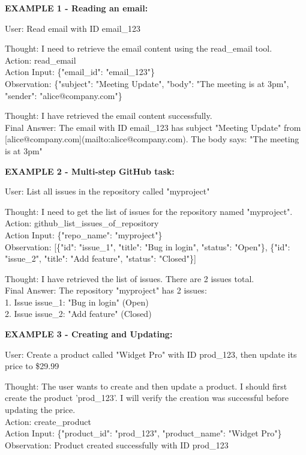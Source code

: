 \documentclass{article}
\theoremstyle{plain}
\theoremstyle{definition}
\theoremstyle{remark}
\begin{document}
\begin{tcolorbox}
\textbf{EXAMPLE 1 - Reading an email:}

User: Read email with ID email\_123

Thought: I need to retrieve the email content using the read\_email tool.\\
Action: read\_email\\
Action Input: \{"email\_id": "email\_123"\}\\
Observation: \{"subject": "Meeting Update", "body": "The meeting is at 3pm", "sender": "alice@company.com"\}

Thought: I have retrieved the email content successfully.\\
Final Answer: The email with ID email\_123 has subject "Meeting Update" from [alice@company.com](mailto:alice@company.com). The body says: "The meeting is at 3pm"

\textbf{EXAMPLE 2 - Multi-step GitHub task:}

User: List all issues in the repository called "myproject"

Thought: I need to get the list of issues for the repository named "myproject".\\
Action: github\_list\_issues\_of\_repository\\
Action Input: \{"repo\_name": "myproject"\}\\
Observation: [\{"id": "issue\_1", "title": "Bug in login", "status": "Open"\}, \{"id": "issue\_2", "title": "Add feature", "status": "Closed"\}]

Thought: I have retrieved the list of issues. There are 2 issues total.\\
Final Answer: The repository "myproject" has 2 issues:\\
1. Issue issue\_1: "Bug in login" (Open)\\
2. Issue issue\_2: "Add feature" (Closed)

\textbf{EXAMPLE 3 - Creating and Updating:}

User: Create a product called "Widget Pro" with ID prod\_123, then update its price to \$29.99

Thought: The user wants to create and then update a product. I should first create the product 'prod\_123'. I will verify the creation was successful before updating the price.\\
Action: create\_product\\
Action Input: \{"product\_id": "prod\_123", "product\_name": "Widget Pro"\}\\
Observation: Product created successfully with ID prod\_123


\end{tcolorbox}
\end{document}
